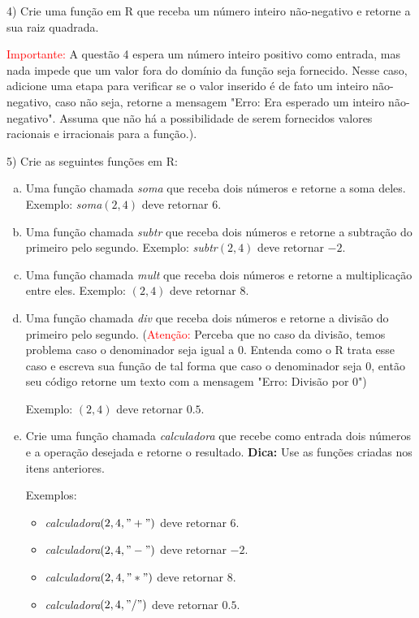\documentclass{article}
\begin{document}
\vspace{5px}

4) Crie uma função em R que receba um número inteiro não-negativo e retorne a sua raiz quadrada. 

\textcolor{red}{Importante:} A questão 4 espera um número inteiro positivo como entrada, mas nada impede que um valor fora do domínio da função seja fornecido. 
Nesse caso, adicione uma etapa para verificar se o valor inserido é de fato um inteiro não-negativo, caso não seja, retorne a 
mensagem "Erro: Era esperado um inteiro não-negativo". Assuma que não há a possibilidade de serem fornecidos valores racionais e irracionais para a função.).
\vspace{5px}

5) Crie as seguintes funções em R:

\begin{enumerate}[a)]
    \item Uma função chamada \textit{soma} que receba dois números e retorne a soma deles.
    Exemplo: \textit{soma}$(2,4)$  deve retornar $6$.
    \item Uma função chamada \textit{subtr} que receba dois números e retorne a subtração do primeiro pelo segundo.
    Exemplo: \textit{subtr}$(2,4)$  deve retornar $-2$.
    \item Uma função chamada \textit{mult} que receba dois números e retorne a multiplicação entre eles.
    Exemplo: $(2,4)$  deve retornar $8$.
    \item Uma função chamada \textit{div} que receba dois números e retorne a divisão do primeiro pelo segundo. (\textcolor{red}{Atenção:} 
    Perceba que no caso da divisão, temos problema caso o denominador seja igual a 0. Entenda como o R trata esse caso e escreva sua função de tal
     forma que caso o denominador seja 0, então seu código retorne um texto com a mensagem "Erro: Divisão por 0")

    Exemplo: $(2,4)$  deve retornar $0.5$.
    \item Crie uma função chamada \textit{calculadora} que recebe como entrada dois números e a operação desejada e retorne o resultado. 
    \textbf{Dica:} Use as funções criadas nos itens anteriores. 
    
    Exemplos: 
    \begin{itemize}
        \item \textit{calculadora}$(2,4, "+")$ deve retornar $6$.
        \item \textit{calculadora}$(2,4, "-")$ deve retornar $-2$.
        \item \textit{calculadora}$(2,4, "*")$ deve retornar $8$.
        \item \textit{calculadora}$(2,4, "/")$ deve retornar $0.5$.
    \end{itemize}
   
\end{enumerate}
\end{document}
